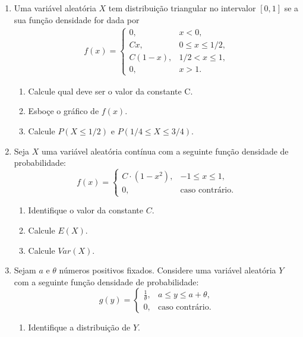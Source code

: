 \documentclass{article}
\begin{document}
\begin{enumerate}

    \item Uma variável aleatória $X$ tem distribuição triangular no intervalor $[0,1]$ se a sua função densidade for dada por
    \begin{align*}
    	f(x) = \left\{\begin{array}{ll}
    		0, & x<0, \\
    		Cx, & 0 \leq x \leq 1/2, \\
    		C(1-x), & 1/2 < x \leq 1, \\
    		0, & x>1.
    	\end{array}\right.
    \end{align*}    	
    \begin{enumerate}
    	\item Calcule qual deve ser o valor da constante C.
    	\item Esboçe o gráfico de $f(x)$.
    	\item Calcule $P(X \leq 1/2)$ e $P(1/4 \leq X \leq 3/4)$.
    \end{enumerate}
	
	\item Seja $X$ uma variável aleatória contínua com a seguinte função densidade de probabilidade:
	$$
	f(x) = 
	\begin{cases}
	C\cdot(1 - x^2), & -1 \leq x \leq 1, \\
	0, & \text{caso contrário}.
	\end{cases}	
	$$
	\begin{enumerate}
		\item Identifique o valor da constante $C$.
		
		\item Calcule $E(X)$.
		
		\item Calcule $Var(X)$.
	\end{enumerate}
	
	\item Sejam $a$ e $\theta$ números positivos fixados. Considere uma variável aleatória $Y$ com a seguinte função densidade de probabilidade:
	$$
	g(y) = 
	\begin{cases}
	\frac{1}{\theta}, & a \leq y \leq a + \theta, \\
	0, & \text{caso contrário}.
	\end{cases}	
	$$
	\begin{enumerate}
		\item Identifique a distribuição de $Y$.
		

\end{enumerate}
\end{enumerate}
\end{document}
